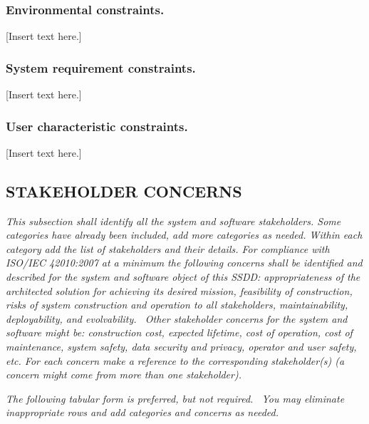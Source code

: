 \documentclass[twoside,letterpaper]{article}
\begin{document}
\subsubsection{Environmental constraints.}
{\color{black}
[Insert text here.] }

\subsubsection{System requirement constraints.}
{\color{black}
[Insert text here.]}

\subsubsection{User characteristic constraints.}
{\color{black}
[Insert text here.]}

\subsection[STAKEHOLDER
CONCERNS]{\bfseries\color{black} STAKEHOLDER
CONCERNS}
{\itshape\color{black}
This subsection shall identify all the system and software stakeholders.
Some categories have already been included, add more categories as
needed. Within each category add the list of stakeholders and their
details. For compliance with ISO/IEC 42010:2007 at a minimum the
following concerns shall be identified and described for the system and
software object of this SSDD: appropriateness of the architected
solution for achieving its desired mission, feasibility of
construction, risks of system construction and operation to all
stakeholders, maintainability, deployability, and evolvability. \ Other
stakeholder concerns for the system and software might be: construction
cost, expected lifetime, cost of operation, cost of maintenance, system
safety, data security and privacy, operator and user safety, etc. For
each concern make a reference to the corresponding stakeholder(s) (a
concern might come from more than one stakeholder).}


\bigskip

{\itshape\color{black}
The following tabular form is preferred, but not required. \ You may
eliminate inappropriate rows and add categories and concerns as
needed.}
\end{document}
